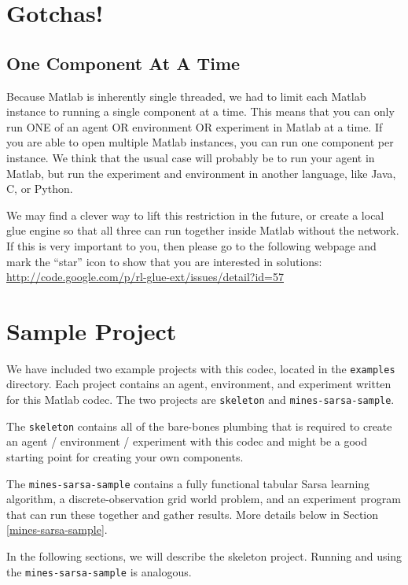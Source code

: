 \documentclass[11pt]{article}
\begin{document}
\section{Gotchas!}
\subsection{One Component At A Time}
\label{one-at-a-time}
Because Matlab is inherently single threaded, we had to limit each Matlab instance to running a single component at a time.  This means that you can only run ONE of an agent OR environment OR experiment in Matlab at a time.  If you are able to open multiple Matlab instances, you can run one
component per instance.  We think that the usual case will probably be to run your agent in Matlab, but run the experiment and environment in another language, like Java, C, or Python.

We may find a clever way to lift this restriction in the future, or create a local glue engine so that all three can run together inside Matlab without the network.  If this is very important to you, then please go to the following webpage and mark the ``star'' icon to show that you are interested in solutions:\newline
\url{http://code.google.com/p/rl-glue-ext/issues/detail?id=57}

\section{Sample Project}
We have included two example projects with this codec, located in the \texttt{examples} directory.  Each project contains an agent, environment, and experiment written for this Matlab codec.  The two projects are \texttt{skeleton} and \texttt{mines-sarsa-sample}.

The \texttt{skeleton} contains all of the bare-bones plumbing that is required to create an agent / environment / experiment with this codec and might be a good starting point for creating your own components.

The \texttt{mines-sarsa-sample} contains a fully functional tabular Sarsa learning algorithm, a discrete-observation grid world problem, and an experiment program that can run these together and gather results.  More details below in Section \ref{mines-sarsa-sample}.

In the following sections, we will describe the skeleton project.  Running and using the \texttt{mines-sarsa-sample} is analogous.
\end{document}
